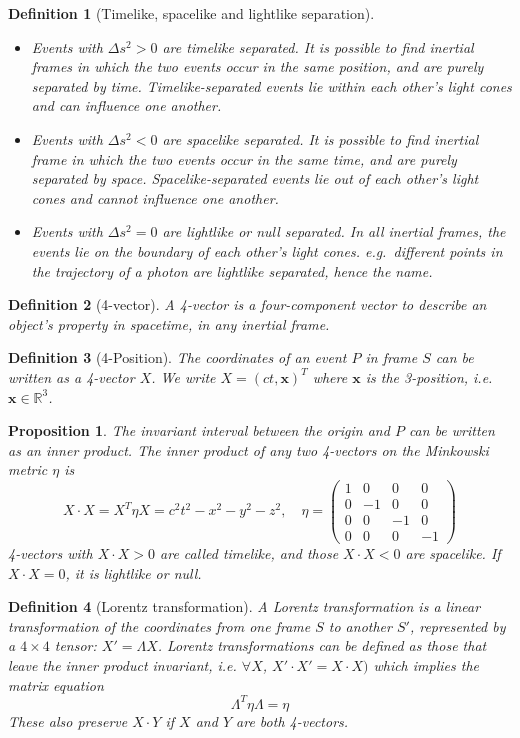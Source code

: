 \documentclass[a4paper]{article}
\theoremstyle{new}
\newtheorem{defi}{Definition}[section]
\newtheorem{prop}{Proposition}[section]
\begin{document}
\begin{defi}[Timelike, spacelike and lightlike separation]\leavevmode
\begin{itemize}
  \item Events with $\Delta s^2 > 0$ are timelike separated. It is possible to find inertial frames in which the two events occur in the same position, and are purely separated by time. Timelike-separated events lie within each other's light cones and can influence one another.
  \item Events with $\Delta s^2 < 0$ are spacelike separated. It is possible to find inertial frame in which the two events occur in the same time, and are purely separated by space. Spacelike-separated events lie out of each other's light cones and cannot influence one another.
  \item Events with $\Delta s^2 = 0$ are lightlike or null separated. In all inertial frames, the events lie on the boundary of each other's light cones. e.g.\ different points in the trajectory of a photon are lightlike separated, hence the name.
\end{itemize}
\end{defi}
\begin{defi}[4-vector]
  A 4-vector is a four-component vector to describe an object's property in spacetime, in any inertial frame.
\end{defi}
\begin{defi}[4-Position]
The coordinates of an event $P$ in frame $S$ can be written as a 4-vector $X$. We write $X=(ct,\mathbf{x})^T$ where $\mathbf{x}$ is the 3-position, i.e. $\mathbf{x}\in\mathbb{R}^3$.
\end{defi}
\begin{prop}
The invariant interval between the origin and $P$ can be written as an inner product. The inner product of any two 4-vectors on the Minkowski metric $\eta$ is
$$X\cdot X = X^T\eta X = c^2t^2 - x^2 - y^2 - z^2,\quad\eta =
  \begin{pmatrix}
    1 & 0 & 0 & 0\\
    0 & -1 & 0 & 0\\
    0 & 0 & -1 & 0\\
    0 & 0 & 0 & -1
  \end{pmatrix}$$
4-vectors with $X\cdot X > 0$ are called timelike, and those $X \cdot X < 0$ are spacelike. If $X\cdot X = 0$, it is lightlike or null.
\end{prop}
\begin{defi}[Lorentz transformation]
A Lorentz transformation is a linear transformation of the coordinates from one frame $S$ to another $S'$, represented by a $4\times 4$ tensor: $X' = \Lambda X$. Lorentz transformations can be defined as those that leave the inner product invariant, i.e. $\forall X$, $X'\cdot X' = X\cdot X)$ which implies the matrix equation
$$\Lambda^T\eta \Lambda = \eta$$
These also preserve $X\cdot Y$ if $X$ and $Y$ are both 4-vectors.
\end{defi}
\end{document}
